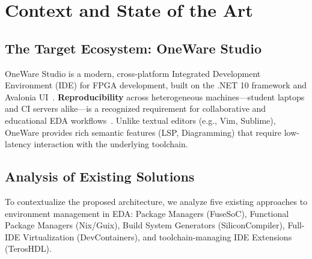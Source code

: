 % 
% 
% 

\chapter{Context and State of the Art}
\label{ch:stateoftheart}

\section{The Target Ecosystem: OneWare Studio}
OneWare Studio is a modern, cross-platform Integrated Development Environment (IDE) for FPGA development, built on the .NET 10 framework and Avalonia UI~\cite{dotnet10}. \textbf{Reproducibility} across heterogeneous machines---student laptops and CI servers alike---is a recognized requirement for collaborative and educational EDA workflows~\cite{boettiger2015introduction}. Unlike textual editors (e.g., Vim, Sublime), OneWare provides rich semantic features (LSP, Diagramming) that require low-latency interaction with the underlying toolchain.
\section{Analysis of Existing Solutions}
To contextualize the proposed architecture, we analyze five existing approaches to environment management in EDA: Package Managers (FuseSoC), Functional Package Managers (Nix/Guix), Build System Generators (SiliconCompiler), Full-IDE Virtualization (DevContainers), and toolchain-managing IDE Extensions (TerosHDL).

